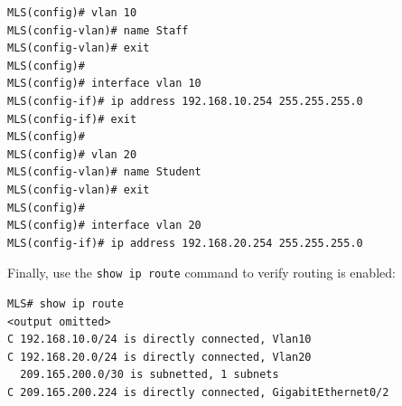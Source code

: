 \begin{verbatim}
MLS(config)# vlan 10
MLS(config-vlan)# name Staff
MLS(config-vlan)# exit
MLS(config)# 
MLS(config)# interface vlan 10
MLS(config-if)# ip address 192.168.10.254 255.255.255.0
MLS(config-if)# exit
MLS(config)# 
MLS(config)# vlan 20
MLS(config-vlan)# name Student
MLS(config-vlan)# exit
MLS(config)# 
MLS(config)# interface vlan 20
MLS(config-if)# ip address 192.168.20.254 255.255.255.0
\end{verbatim}

Finally, use the \verb|show ip route| command to verify routing is enabled:

\begin{verbatim}
MLS# show ip route
<output omitted>
C 192.168.10.0/24 is directly connected, Vlan10
C 192.168.20.0/24 is directly connected, Vlan20
  209.165.200.0/30 is subnetted, 1 subnets
C 209.165.200.224 is directly connected, GigabitEthernet0/2
\end{verbatim}